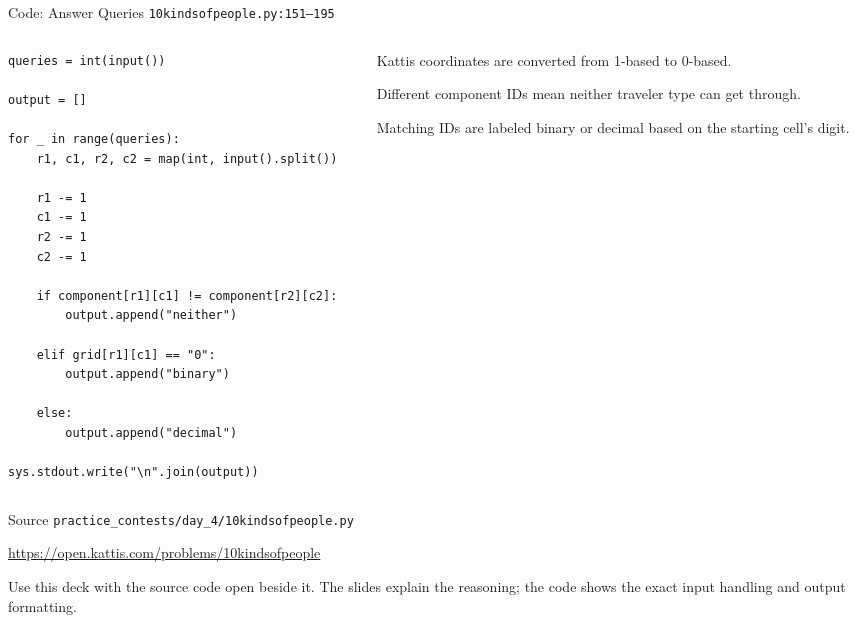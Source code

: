 \documentclass[aspectratio=169,11pt]{beamer}
\begin{document}
\begin{frame}[fragile]{Code: Answer Queries}
\scriptsize
{} \texttt{10kindsofpeople.py:151--195}

\vspace{0.08cm}
\begin{columns}[T,totalwidth=\textwidth]
\begin{column}{0.58\textwidth}
\begin{lstlisting}[style=cpcode]
queries = int(input())

output = []

for _ in range(queries):
    r1, c1, r2, c2 = map(int, input().split())

    r1 -= 1
    c1 -= 1
    r2 -= 1
    c2 -= 1

    if component[r1][c1] != component[r2][c2]:
        output.append("neither")

    elif grid[r1][c1] == "0":
        output.append("binary")

    else:
        output.append("decimal")

sys.stdout.write("\n".join(output))
\end{lstlisting}
\end{column}
\begin{column}{0.38\textwidth}
\begin{tightitemize}
  \item Kattis coordinates are converted from 1-based to 0-based.
  \item Different component IDs mean neither traveler type can get through.
  \item Matching IDs are labeled binary or decimal based on the starting cell's digit.
\end{tightitemize}
\end{column}
\end{columns}
\end{frame}

\begin{frame}{Source}
\small
{} \texttt{practice\_contests/day\_4/10kindsofpeople.py}

\vspace{0.3cm}
 \url{https://open.kattis.com/problems/10kindsofpeople}

\vspace{0.45cm}
Use this deck with the source code open beside it. The slides explain the reasoning; the code shows the exact input handling and output formatting.
\end{frame}
\end{document}

